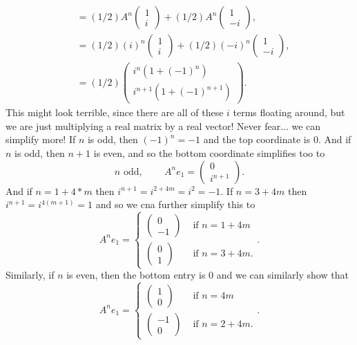 \documentclass[11pt]{article}
\begin{document}
\begin{enumerate}
\begin{enumerate}
\begin{align*}
&= (1/2) A^n  \begin{pmatrix} 1 \\ i \end{pmatrix} + (1/2)A^n \begin{pmatrix} 1 \\ -i \end{pmatrix},\\
&= (1/2) (i)^n  \begin{pmatrix} 1 \\ i \end{pmatrix} + (1/2)(-i)^n \begin{pmatrix} 1 \\ -i \end{pmatrix},\\
& = (1/2)\begin{pmatrix} i^n(1 + (-1)^n) \\ i^{n+1}(1 + (-1)^{n+1}) \end{pmatrix}.
\end{align*}
This might look terrible, since there are all of these $i$ terms floating around, but we are just multiplying a real matrix by a real vector!  Never fear... we can simplify more!  If $n$ is odd, then $(-1)^n = -1$ and the top coordinate is $0$.  And if $n$ is odd, then $n+1$ is even, and so the bottom coordinate simplifies too to
\[ n \text{ odd, } \qquad A^n e_1 = \begin{pmatrix} 0 \\ i^{n+1} \end{pmatrix}.\]
And if $n = 1 + 4*m$ then $i^{n+1} = i^{2 + 4m} = i^2 = -1$.  If $n = 3 + 4m$ then $i^{n+1} = i^{4(m+1)} = 1$ and so we cna further simplify this to
\[ A^n e_1 = \begin{cases} \begin{pmatrix} 0 \\ - 1 \end{pmatrix} & \text{ if $n = 1 + 4m$} \\ \begin{pmatrix} 0 \\ 1 \end{pmatrix} & \text{ if $n = 3 + 4m$}. \end{cases}.\]
Similarly, if $n$ is even, then the bottom entry is $0$ and we can similarly show that
\[ A^n e_1 = \begin{cases} \begin{pmatrix} 1 \\ 0  \end{pmatrix} & \text{ if $n = 4m$} \\ \begin{pmatrix} -1 \\ 0 \end{pmatrix} & \text{ if $n = 2 + 4m$}. \end{cases}.\]

\end{enumerate}
\end{enumerate}
\end{document}
